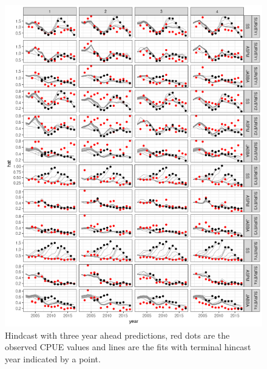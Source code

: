 \documentclass[a4paper]{article}
\begin{document}
\begin{figure}[htbp]
\centering
\includegraphics[width=6in]{final-hy3-plot-1.png}
\caption{Hindcast with three year ahead predictions, red dots are the observed CPUE values and lines are the fits with terminal hincast year indicated by a point.}
\label{fig:hy3}
\end{figure}
\end{document}
